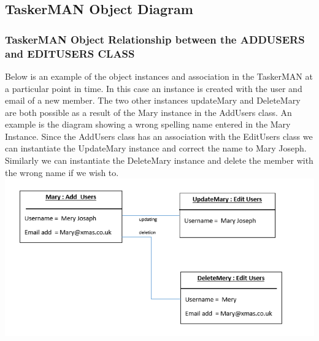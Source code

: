 \documentclass{project}
\begin{document}
\subsection{TaskerMAN Object Diagram}
\subsubsection{TaskerMAN Object Relationship between the ADD\textunderscore USERS and EDIT\textunderscore USERS CLASS}
Below is an example of the object instances and association in the TaskerMAN at a particular point in time. In this case an instance is created with the user and email of a new member. The two other instances updateMary and DeleteMary are both possible  as a result of the Mary instance in the Add\textunderscore Users class. An example is the diagram showing a wrong spelling name entered in the Mary Instance.  Since the Add\textunderscore Users class has an association with the Edit\textunderscore Users class we can instantiate the UpdateMary instance and correct the name to Mary Joseph. Similarly we can instantiate the DeleteMary instance and delete the member with the wrong name if we wish to. \\
\includegraphics[width=1\textwidth, center]{images/Detailed-Design/TaskerMANObjectDiagram1} \\
\end{document}
